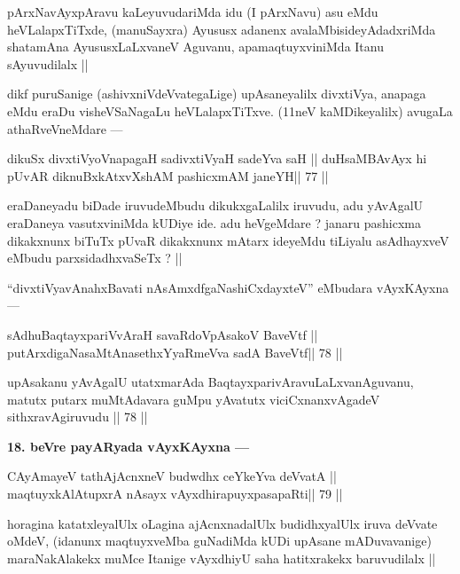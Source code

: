 \begin{artha}
pArxNavAyxpAravu kaLeyuvudariMda idu (I pArxNavu) asu eMdu heVLalapxTiTxde, (manuSayxra) Ayususx adanenx avalaMbisideyAdadxriMda shatamAna AyususxLaLxvaneV Aguvanu, apamaqtuyxviniMda Itanu sAyuvudilalx ||
\end{artha}

\begin{artha}
dikf puruSanige (ashivxniVdeVvategaLige) upAsaneyalilx divxtiVya, anapaga eMdu eraDu visheVSaNagaLu heVLalapxTiTxve. (11neV kaMDikeyalilx) avugaLa athaRveVneMdare ---
\end{artha}

\begin{shl}
dikuSx divxtiVyoV\s napagaH sadivxtiVyaH sadeYva saH ||
duHsaMBAvAyx hi pUvAR diknuBxkAtxvX\s\s shAM pashicxmAM janeYH\hfill || 77 ||
\end{shl}

\begin{artha}
eraDaneyadu biDade iruvudeMbudu dikukxgaLalilx iruvudu, adu yAvAgalU eraDaneya vasutxviniMda kUDiye ide. adu heVgeMdare ? janaru pashicxma dikakxnunx biTuTx pUvaR dikakxnunx mAtarx ideyeMdu tiLiyalu asAdhayxveV eMbudu parxsidadhxvaSeTx ? ||
\end{artha}

\begin{artha}
``divxtiVyavAnahxBavati nAsAmxdfgaNashiCxdayxteV'' eMbudara vAyxKAyxna ---
\end{artha} 

\begin{shl}
sAdhuBaqtayxpariVvAraH savaRdoVpAsakoV BaveVtf ||
putArxdigaNasaMtAnasethxYyaRmeVva sadA BaveVtf\hfill || 78 ||
\end{shl}

\begin{artha}
upAsakanu yAvAgalU utatxmarAda BaqtayxparivAravuLaLxvanAguvanu, matutx putarx muMtAdavara guMpu yAvatutx viciCxnanxvAgadeV sithxravAgiruvudu || 78 ||
\end{artha} 

\begin{artha}
{\bf 18. beVre payARyada vAyxKAyxna ---}
\end{artha} 

\begin{shl}
CAyAmayeV tathA\s jAcnxneV budwdhx ceYkeYva deVvatA ||
maqtuyxkAlAtupxrA nAsayx vAyxdhirapuyxpasapaRti\hfill || 79 ||
\end{shl}

\begin{artha}
horagina katatxleyalUlx oLagina ajAcnxnadalUlx budidhxyalUlx iruva deVvate oMdeV, (idanunx maqtuyxveMba guNadiMda kUDi upAsane mADuvavanige) maraNakAlakekx muMce Itanige vAyxdhiyU saha hatitxrakekx baruvudilalx ||
\end{artha}

